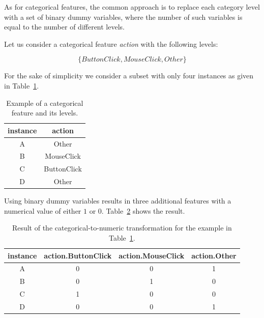 As for categorical features, the common approach is to replace each category level with a set of binary dummy variables, where the number of such variables is equal to the number of different levels.

Let us consider a categorical feature \textit{action} with the following levels: 

\[ \{ButtonClick, MouseClick, Other\} \]

For the sake of simplicity we consider a subset with only four instances as given in Table~\ref{tab:feature-categorical-rep}. 
\begin{table}[h!]
  \begin{center}
    \caption{Example of a categorical feature and its levels.}
    \label{tab:feature-categorical-rep}
    \begin{tabular}{c|c}
    instance & action \\
      \hline
     A & Other \\ 
     \hline 
       B & MouseClick \\ 
     \hline
       C & ButtonClick \\ 
     \hline
       D & Other \\ 
     \hline
    \end{tabular}
  \end{center}
\end{table}

Using binary dummy variables results in three additional features with a numerical value of either \(1\) or \(0\). Table~\ref{tab:feature-binarization} shows the result.

\clearpage


\begin{table}
  \begin{center}
    \caption{Result of the categorical-to-numeric transformation for the example in Table~\ref{tab:feature-categorical-rep}.}
    \label{tab:feature-binarization}
    \begin{tabular}{c|c|c|c|}
    instance & action.ButtonClick & action.MouseClick & action.Other \\
      \hline
     A & 0 & 0 & 1 \\ 
     \hline 
       B & 0 & 1 & 0 \\ 
     \hline
       C & 1 & 0 & 0 \\ 
     \hline
       D & 0 & 0 & 1 \\ 
     \hline
    \end{tabular}
  \end{center}
\end{table}

